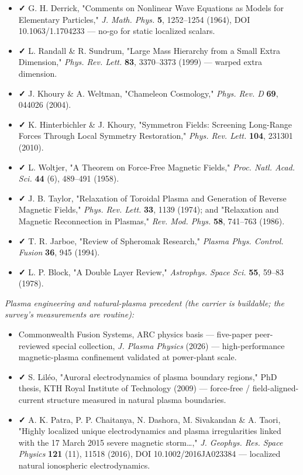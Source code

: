 \documentclass[11pt]{article}
\begin{document}
\begin{itemize}
\item \textbf{✓} G. H. Derrick, "Comments on Nonlinear Wave Equations as Models for Elementary Particles," \emph{J. Math. Phys.} \textbf{5}, 1252--1254 (1964), DOI 10.1063/1.1704233 --- no-go for static localized scalars.
\item \textbf{✓} L. Randall \& R. Sundrum, "Large Mass Hierarchy from a Small Extra Dimension," \emph{Phys. Rev. Lett.} \textbf{83}, 3370--3373 (1999) --- warped extra dimension.
\item \textbf{✓} J. Khoury \& A. Weltman, "Chameleon Cosmology," \emph{Phys. Rev. D} \textbf{69}, 044026 (2004).
\item \textbf{✓} K. Hinterbichler \& J. Khoury, "Symmetron Fields: Screening Long-Range Forces Through Local Symmetry Restoration," \emph{Phys. Rev. Lett.} \textbf{104}, 231301 (2010).
\item \textbf{✓} L. Woltjer, "A Theorem on Force-Free Magnetic Fields," \emph{Proc. Natl. Acad. Sci.} \textbf{44} (6), 489--491 (1958).
\item \textbf{✓} J. B. Taylor, "Relaxation of Toroidal Plasma and Generation of Reverse Magnetic Fields," \emph{Phys. Rev. Lett.} \textbf{33}, 1139 (1974); and "Relaxation and Magnetic Reconnection in Plasmas," \emph{Rev. Mod. Phys.} \textbf{58}, 741--763 (1986).
\item \textbf{✓} T. R. Jarboe, "Review of Spheromak Research," \emph{Plasma Phys. Control. Fusion} \textbf{36}, 945 (1994).
\item \textbf{✓} L. P. Block, "A Double Layer Review," \emph{Astrophys. Space Sci.} \textbf{55}, 59--83 (1978).
\end{itemize}

\emph{Plasma engineering and natural-plasma precedent (the carrier is buildable; the survey's measurements are routine):}

\begin{itemize}
\item Commonwealth Fusion Systems, ARC physics basis --- five-paper peer-reviewed special collection, \emph{J. Plasma Physics} (2026) --- high-performance magnetic-plasma confinement validated at power-plant scale.
\item \textbf{✓} S. Liléo, "Auroral electrodynamics of plasma boundary regions," PhD thesis, KTH Royal Institute of Technology (2009) --- force-free / field-aligned-current structure measured in natural plasma boundaries.
\item \textbf{✓} A. K. Patra, P. P. Chaitanya, N. Dashora, M. Sivakandan \& A. Taori, "Highly localized unique electrodynamics and plasma irregularities linked with the 17 March 2015 severe magnetic storm\ldots{}," \emph{J. Geophys. Res. Space Physics} \textbf{121} (11), 11518 (2016), DOI 10.1002/2016JA023384 --- localized natural ionospheric electrodynamics.
\end{itemize}
\end{document}

